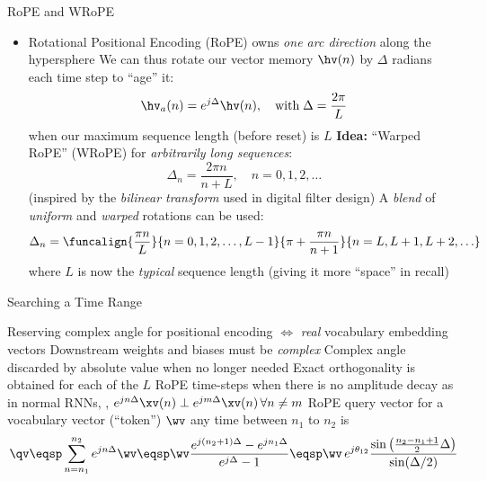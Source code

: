 \begin{slide}[\slideopts,toc={WRoPE}]{RoPE and WRoPE}

\vspace{-1em}

\begin{itemize}
\item Rotational Positional Encoding (RoPE) owns \emph{one arc direction} along the hypersphere %
  \mpitem We can thus rotate our vector memory $\hv(n)$ by $\Delta$ radians each time step to ``age'' it:
  \[
  \hv_a(n) = e^{j\Delta}\hv(n), \quad \mbox{with}\; \Delta = \frac{2\pi}{L}
  \]
  when our maximum sequence length (before reset) is $L$
  \mpitem \textbf{Idea:} ``Warped RoPE'' (WRoPE) for \emph{arbitrarily long sequences}:
  \[
  \Delta_n = \frac{2\pi n}{n+L}, \quad n=0,1,2,\ldots
  \]
  \maybepause
  (inspired by the \emph{bilinear transform} used in digital filter design)
  \mpitem A \emph{blend} of \emph{uniform} and \emph{warped} rotations can be used:
  \[
  \Delta_n = \funcalign{\frac{\pi n}{L}}{n=0,1,2,\ldots,L-1}{%
    \pi + \frac{\pi n}{n+1}}{n=L,L+1,L+2,\ldots}
  \]
  where $L$ is now the \emph{typical} sequence length (giving it more
  ``space'' in recall)
\end{itemize}
\end{slide}

\begin{slide}[\slideopts,toc={}]{Searching a Time Range}

\vspace{-1em}

\begin{itemize}
  \mpitem Reserving complex angle for positional encoding $\Leftrightarrow$ \emph{real} vocabulary
          embedding vectors
  \mpitem Downstream weights and biases must be \emph{complex}
  \mpitem Complex angle discarded by absolute value when no longer needed
  \mpitem Exact orthogonality is obtained for each of the $L$ RoPE time-steps when there is 
  no amplitude decay as in normal RNNs, \ie, $e^{jn\Delta}\xv(n)\perp e^{jm\Delta}\xv(n)\, \forall n\ne m$
  \mpitem RoPE query vector for a vocabulary vector (``token'') $\wv$ any time between $n_1$ to $n_2$ is
   \[
   \qv \eqsp \sum_{n=n_1}^{n_2}e^{jn \Delta}\wv
   \eqsp \wv \frac{e^{j(n_2+1)\Delta} - e^{jn_1\Delta}}{e^{j\Delta}-1}
   \eqsp \wv\, e^{j\theta_{12}}\frac{\sin\left(\frac{n_2-n_1+1}{2}\Delta\right)}{\sin(\Delta/2)}
   \]
   \vspace{-1em}
\end{itemize}
\end{slide}

